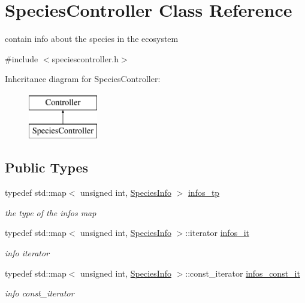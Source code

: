 \hypertarget{classSpeciesController}{
\section{SpeciesController Class Reference}
\label{classSpeciesController}
}


contain info about the species in the ecosystem  




{\ttfamily \#include $<$speciescontroller.h$>$}

Inheritance diagram for SpeciesController:\begin{figure}[H]
\begin{center}
\leavevmode
\includegraphics[height=2.000000cm]{classSpeciesController}
\end{center}
\end{figure}
\subsection*{Public Types}
\begin{DoxyCompactItemize}
\item 
typedef std::map$<$ unsigned int, \hyperlink{structSpeciesInfo}{SpeciesInfo} $>$ \hyperlink{classSpeciesController_a4b2e6ab3bbcf3d53a4588967eb615ff7}{infos\_\-tp}
\begin{DoxyCompactList}\small\item\em the type of the infos map \end{DoxyCompactList}\item 
typedef std::map$<$ unsigned int, \hyperlink{structSpeciesInfo}{SpeciesInfo} $>$::iterator \hyperlink{classSpeciesController_a4026e8acb68f2b04ecc13bb20c68008a}{infos\_\-it}
\begin{DoxyCompactList}\small\item\em info iterator \end{DoxyCompactList}\item 
typedef std::map$<$ unsigned int, \hyperlink{structSpeciesInfo}{SpeciesInfo} $>$::const\_\-iterator \hyperlink{classSpeciesController_a0dc92662511aca888d67516eb87b6260}{infos\_\-const\_\-it}
\begin{DoxyCompactList}\small\item\em info const\_\-iterator \end{DoxyCompactList}\end{DoxyCompactItemize}
